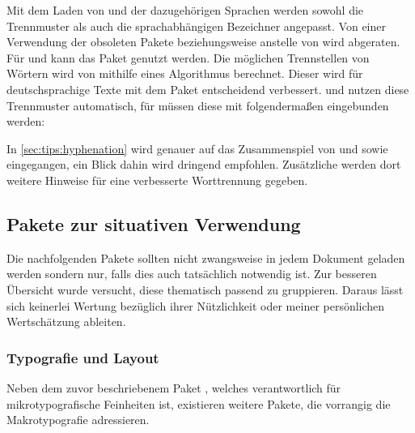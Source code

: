 \begin{DeclarePackages}
  Mit dem Laden von  und der dazugehörigen Sprachen werden 
  sowohl die Trennmuster als auch die sprachabhängigen Bezeichner angepasst.
  Von einer Verwendung der obsoleten Pakete  beziehungsweise 
   anstelle von  wird abgeraten. Für 
   und  kann das Paket  
  genutzt werden.
  Die möglichen Trennstellen von Wörtern wird von  mithilfe 
  eines Algorithmus berechnet. Dieser wird für deutschsprachige Texte mit dem 
  Paket  entscheidend verbessert.  und 
   nutzen diese Trennmuster automatisch, für  
  müssen diese mit folgendermaßen eingebunden werden:
  \begin{Code}
    \usepackage[ngerman=ngerman-x-latest]{hyphsubst}
  \end{Code}\vspace{-\baselineskip}%
  In \autoref{sec:tips:hyphenation} wird genauer auf das Zusammenspiel von 
   und  sowie  eingegangen, 
  ein Blick dahin wird dringend empfohlen. Zusätzliche werden dort weitere 
  Hinweise für eine verbesserte Worttrennung gegeben.
\end{DeclarePackages}



\subsection{Pakete zur situativen Verwendung}

Die nachfolgenden Pakete sollten nicht zwangsweise in jedem Dokument geladen 
werden sondern nur, falls dies auch tatsächlich notwendig ist. Zur besseren 
Übersicht wurde versucht, diese thematisch passend zu gruppieren. Daraus lässt 
sich keinerlei Wertung bezüglich ihrer Nützlichkeit oder meiner persönlichen 
Wertschätzung ableiten.



\subsubsection{%
  Typografie und Layout%
}

Neben dem zuvor beschriebenem Paket , welches verantwortlich 
für mikrotypografische Feinheiten ist, existieren weitere Pakete, die vorrangig 
die Makrotypografie adressieren.


